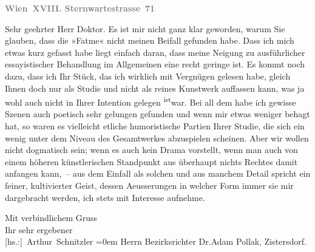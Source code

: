 \pstart
           \textcolor{gray}{\textbf{Wien XVIII. Sternwartestrasse 71}}\pend
           
\pstart\center{}Sehr geehrter Herr Doktor.\pend\vspace{0.5em}
\pstart
           Es ist mir nicht ganz klar geworden, warum Sie glauben, dass die »Fatme« nicht meinen Beifall gefunden habe. Dass ich mich etwas
               kurz gefasst habe liegt einfach daran, dass meine Neigung zu ausführlicher
               essayistischer Behandlung im Allgemeinen eine recht geringe ist. Es kommt noch dazu,
               dass ich Ihr Stück, das ich
               wirklich mit Vergnügen gelesen habe, gleich Ihnen doch nur als Studie und nicht als
               reines Kunstwerk auffassen kann, was ja wohl auch nicht in Ihrer Intention gelegen \substVorne{}\textsuperscript{ist}\substDazwischen{}war\substHinten{}. Bei all dem habe ich gewisse Szenen auch poetisch sehr gelungen gefunden
               und wenn mir etwas weniger behagt hat, so waren es vielleicht etliche humoristische
               Partien Ihrer Studie, die sich ein wenig unter dem Niveau des Gesamtwerkes abzuspielen scheinen. Aber wir
               wollen nicht dogmatisch sein; wenn {\pb}es auch kein Drama  vorstellt, wenn man auch von einem höheren
               künstlerischen Standpunkt aus überhaupt nichts Rechtes damit anfangen kann, – aus dem
               Einfall als solchen und aus manchem Detail spricht ein feiner, kultivierter Geist,
               dessen Aeusserungen in welcher Form immer sie mir dargebracht werden, ich \introOben{}stets\introOben{} mit Interesse aufnehme.\pend
           
\pstart
           Mit verbindlichem Gruss{\\[\baselineskip]}Ihr sehr ergebener{\\[\baselineskip]}\spacefill\mbox{{[}hs.:{]} Arthur Schnitzler}\pend
           \leftskip=0em{}
\pstart
           \noindent{}Herrn Bezirksrichter Dr.Adam Pollak, Zistersdorf.\pend
           \endnumbering{}  \newcommand{\dateiname}{L02137}\newcommand{\titel}{Arthur Schnitzler an Robert Adam, 13. 5. 1913}\newcommand{\editorInnen}{Martin Anton Müller und Gerd-Hermann Susen}
